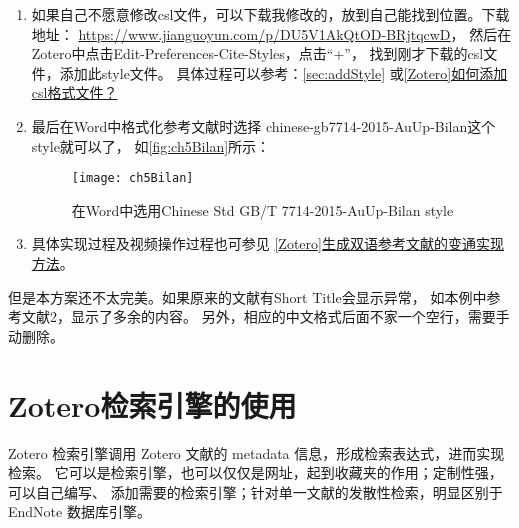 \documentclass[cn,11pt,chinese]{elegantbook}
\begin{document}
\begin{enumerate}
\begin{lstlisting}
								[5] 朱磊, 张馨心, 谢艳英, 等. 类蛋白反应的作用机制及其对海洋源蛋白修饰的研究进展[J]. 食品工业科技, 2020,41(09):362–367. 
								ZHU L,ZHANG X X,XIE Y Y,et al. Research progress on mechanism of plastein reactions and its modification function of marine proteins [J]. Science and Technology of Food Industry, 2020, 41(09): 362–367.
							\end{lstlisting}
						\item 如果自己不愿意修改csl文件，可以下载我修改的，放到自己能找到位置。下载地址：
							\url{https://www.jianguoyun.com/p/DU5V1AkQtOD-BRjtqcwD}，
							然后在Zotero中点击Edit-Preferences-Cite-Styles，点击“+”，
							找到刚才下载的csl文件，添加此style文件。
							具体过程可以参考：\cref{sec:addStyle}
							或\href{https://zhuanlan.zhihu.com/p/64624484}{[Zotero]如何添加csl格式文件？}
						\item 	
							最后在Word中格式化参考文献时选择
							chinese-gb7714-2015-AuUp-Bilan这个style就可以了，
							如\autoref{fig:ch5Bilan}所示：
								\begin{figure}[ht]
									\centering
									\texttt{[image: ch5Bilan]}
									\caption{在Word中选用Chinese Std GB/T 7714-2015-AuUp-Bilan style}
									\label{fig:ch5Bilan}
								\end{figure}
	
						\item 	具体实现过程及视频操作过程也可参见
							\href{https://zhuanlan.zhihu.com/p/282826403}
							{[Zotero]生成双语参考文献的变通实现方法}。
				\end{enumerate}

				 
				但是本方案还不太完美。如果原来的文献有Short Title会显示异常，
				如本例中参考文献2，显示了多余的内容。
				另外，相应的中文格式后面不家一个空行，需要手动删除。

				

		\section{Zotero检索引擎的使用}\label{sec:Engines}
			Zotero 检索引擎调用 Zotero 文献的 metadata 信息，形成检索表达式，进而实现检索。
			它可以是检索引擎，也可以仅仅是网址，起到收藏夹的作用；定制性强，可以自己编写、
			添加需要的检索引擎；针对单一文献的发散性检索，明显区别于 EndNote 数据库引擎。
\end{document}
